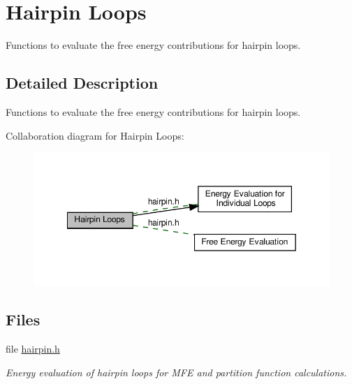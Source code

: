 \hypertarget{group__eval__loops__hp}{}\section{Hairpin Loops}
\label{group__eval__loops__hp}


Functions to evaluate the free energy contributions for hairpin loops.  




\subsection{Detailed Description}
Functions to evaluate the free energy contributions for hairpin loops. 

Collaboration diagram for Hairpin Loops\+:
\nopagebreak
\begin{figure}[H]
\begin{center}
\leavevmode
\includegraphics[width=349pt]{group__eval__loops__hp}
\end{center}
\end{figure}
\subsection*{Files}
\begin{DoxyCompactItemize}
\item 
file \hyperlink{hairpin_8h}{hairpin.\+h}
\begin{DoxyCompactList}\small\item\em Energy evaluation of hairpin loops for M\+FE and partition function calculations. \end{DoxyCompactList}\end{DoxyCompactItemize}
